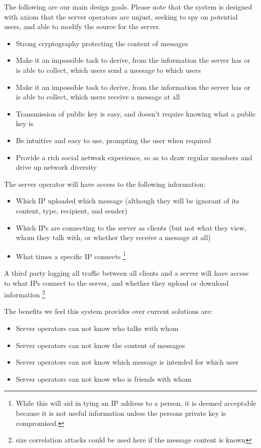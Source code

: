 The following are our main design goals. Please note that the system is designed
with axiom that the server operators are unjust, seeking to spy on potential users, and
able to modify the source for the server.
\begin{itemize}
\item Strong cryptography protecting the content of messages
\item Make it an impossible task to derive, from the information the server has
      or is able to collect, which users send a message to which users
\item Make it an impossible task to derive, from the information the server has
      or is able to collect, which users receive a message at all
\item Transmission of public key is easy, and doesn't require knowing what a
      public key is
\item Be intuitive and easy to use, prompting the user when required
\item Provide a rich social network experience, so as to draw regular members
      and drive up network diversity
\end{itemize}

The server operator will have access to the following information:
\begin{itemize}
\item Which IP uploaded which message (although they will be ignorant of its
content, type, recipient, and sender)
\item Which IPs are connecting to the server as clients (but not what they view,
whom they talk with, or whether they receive a message at all)
\item What times a specific IP connects \footnote {While this will aid in tying
an IP address to a person, it is deemed acceptable because it is not useful
information unless the persons private key is compromised.}
\end{itemize}

A third party logging all traffic between all clients and a server will have
access to what IPs connect to the server, and whether they upload or download
information \footnote{size correlation attacks could be used here if the message
content is known}

The benefits we feel this system provides over current solutions are:
\begin{itemize}
\item Server operators can not know who talks with whom
\item Server operators can not know the content of messages
\item Server operators can not know which message is intended for which user
\item Server operators can not know who is friends with whom
\end{itemize}

